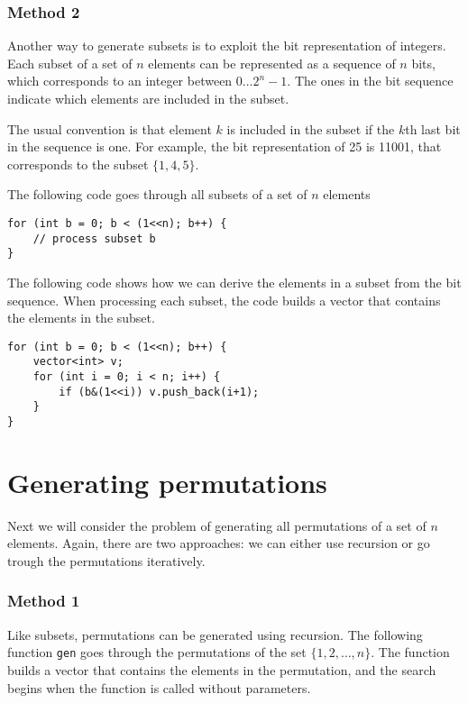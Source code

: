\subsubsection{Method 2}

Another way to generate subsets is to exploit
the bit representation of integers.
Each subset of a set of $n$ elements
can be represented as a sequence of $n$ bits,
which corresponds to an integer between $0 \ldots 2^n-1$.
The ones in the bit sequence indicate
which elements are included in the subset.

The usual convention is that element $k$
is included in the subset if the $k$th last bit
in the sequence is one.
For example, the bit representation of 25
is 11001, that corresponds to the subset $\{1,4,5\}$.

The following code goes through all subsets
of a set of $n$ elements

\begin{lstlisting}
for (int b = 0; b < (1<<n); b++) {
    // process subset b
}
\end{lstlisting}

The following code shows how we can derive
the elements in a subset from the bit sequence.
When processing each subset,
the code builds a vector that contains the
elements in the subset.

\begin{lstlisting}
for (int b = 0; b < (1<<n); b++) {
    vector<int> v;
    for (int i = 0; i < n; i++) {
        if (b&(1<<i)) v.push_back(i+1);
    }
}
\end{lstlisting}

\section{Generating permutations}


Next we will consider the problem of generating
all permutations of a set of $n$ elements.
Again, there are two approaches:
we can either use recursion or go trough the
permutations iteratively.

\subsubsection{Method 1}

Like subsets, permutations can be generated
using recursion.
The following function \texttt{gen} goes
through the permutations of the set $\{1,2,\ldots,n\}$.
The function builds a vector that contains
the elements in the permutation,
and the search begins when the function is
called without parameters.

